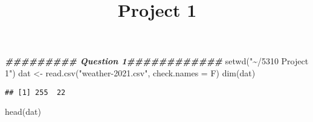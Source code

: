 \documentclass[
]{article}
\title{Project 1}
\author{}
\date{\vspace{-2.5em}}
\newenvironment{Shaded}{\begin{snugshade}}{\end{snugshade}}
\newcommand{\AttributeTok}[1]{\textcolor[rgb]{0.77,0.63,0.00}{#1}}
\newcommand{\DocumentationTok}[1]{\textcolor[rgb]{0.56,0.35,0.01}{\textbf{\textit{#1}}}}
\newcommand{\FunctionTok}[1]{\textcolor[rgb]{0.00,0.00,0.00}{#1}}
\newcommand{\NormalTok}[1]{#1}
\newcommand{\OtherTok}[1]{\textcolor[rgb]{0.56,0.35,0.01}{#1}}
\newcommand{\StringTok}[1]{\textcolor[rgb]{0.31,0.60,0.02}{#1}}
\begin{document}
\maketitle

\begin{Shaded}
\begin{Highlighting}[]
\DocumentationTok{\#\#\#\#\#\#\#\#\# Question 1\#\#\#\#\#\#\#\#\#\#\#\#}
\FunctionTok{setwd}\NormalTok{(}\StringTok{"\textasciitilde{}/5310 Project 1"}\NormalTok{)}
\NormalTok{dat }\OtherTok{\textless{}{-}} \FunctionTok{read.csv}\NormalTok{(}\StringTok{"weather{-}2021.csv"}\NormalTok{, }\AttributeTok{check.names =}\NormalTok{ F)}
\FunctionTok{dim}\NormalTok{(dat)}
\end{Highlighting}
\end{Shaded}

\begin{verbatim}
## [1] 255  22
\end{verbatim}

\begin{Shaded}
\begin{Highlighting}[]
\FunctionTok{head}\NormalTok{(dat)}
\end{Highlighting}
\end{Shaded}
\end{document}
